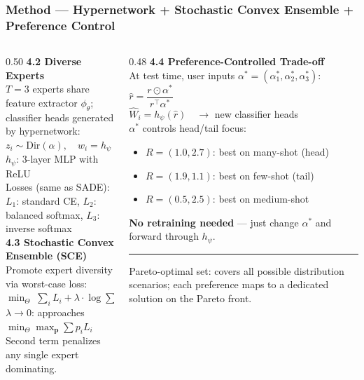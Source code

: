 \documentclass[10pt,aspectratio=169]{beamer}
\begin{document}
\begin{frame}
\frametitle{Method --- Hypernetwork + Stochastic Convex Ensemble + Preference Control}
{\small
\begin{columns}[T]
\begin{column}{0.50\textwidth}
\textbf{4.2 Diverse Experts}\\[2pt]
$T\!=\!3$ experts share feature extractor $\phi_\theta$;\\
classifier heads generated by hypernetwork:\\[2pt]
$z_i \sim \text{Dir}(\alpha), \quad w_i = h_\psi(z_i)$\\[2pt]
{\scriptsize $h_\psi$: 3-layer MLP with ReLU}\\[2pt]
Losses (same as SADE):\\
{\scriptsize $L_1$: standard CE, $L_2$: balanced softmax, $L_3$: inverse softmax}\\[8pt]

\textbf{4.3 Stochastic Convex Ensemble (SCE)}\\[2pt]
Promote expert diversity via worst-case loss:\\[2pt]
$\min_\Theta\;\textstyle\sum_i L_i + \lambda\cdot\log\!\sum_i\exp(L_i/\lambda)$\\[2pt]
{\scriptsize $\lambda\!\to\!0$: approaches $\min_\Theta\max_\mathbf{p}\sum p_i L_i$}\\
{\scriptsize Second term penalizes any single expert dominating.}
\end{column}
\begin{column}{0.48\textwidth}
\textbf{4.4 Preference-Controlled Trade-off}\\[2pt]
At test time, user inputs $\alpha^*\!=\!(\alpha_1^*,\alpha_2^*,\alpha_3^*)$:\\[3pt]
$\hat{r} = \dfrac{r \odot \alpha^*}{r^\top\!\alpha^*}$\\[4pt]
$\hat{W}_i = h_\psi(\hat{r}) \quad\rightarrow$ new classifier heads\\[3pt]
{\scriptsize $\alpha^*$ controls head/tail focus:}
\begin{itemize}\setlength\itemsep{1pt}
  \item {\scriptsize $R\!=\!(1.0,2.7)$: best on many-shot (head)}
  \item {\scriptsize $R\!=\!(1.9,1.1)$: best on few-shot (tail)}
  \item {\scriptsize $R\!=\!(0.5,2.5)$: best on medium-shot}
\end{itemize}
\vspace{4pt}
{\scriptsize \textbf{No retraining needed} --- just change $\alpha^*$ and forward through $h_\psi$.}\\[6pt]

\hrule\vspace{4pt}
{\scriptsize Pareto-optimal set: covers all possible distribution scenarios; each preference maps to a dedicated solution on the Pareto front.}
\end{column}
\end{columns}
}
\end{frame}
\end{document}
